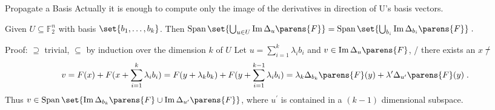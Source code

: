 \documentclass[%
    10pt,
    professionalfont,
    aspectratio=169,
]{beamer}
\newcommand{\F}{\mathbb{F}}
\newcommand{\derive}[2]{\Delta_{#1}\parens{#2}}
\DeclareMathOperator{\ImOp}{Im}
\renewcommand{\Im}[1]{\ImOp {#1}}
\DeclareMathOperator{\SpanOp}{Span}
\newcommand{\Span}[1]{\SpanOp\set{#1}}
\begin{document}
\begin{frame}{Propagate a Basis}
    Actually it is enough to compute only the image of the derivatives in direction of U's basis vectors.
    \begin{lemma}
        Given $U \subseteq \F_2^n$ with basis $\set{b_1, \ldots, b_k}$.
        Then
        $
            \Span{\bigcup_{u \in U} \Im{\derive{u}{F}}} = \Span{\bigcup_{b_i} \Im{\derive{b_i}{F}}}\;.
        $
    \end{lemma}
    \pause
    \begin{block}{Proof: $\supseteq$ trivial, $\subseteq$ by induction over the dimension $k$ of $U$}
        Let $u = \sum_{i=1}^k \lambda_i b_i$ and $v \in \Im{\derive{u}{F}}$, \ie/ there exists an $x$ \st/
        \begin{equation*}
            v = F(x) + F(x + \sum_{i=1}^k \lambda_i b_i)
              = F(y + \lambda_k b_k) + F(y + \sum_{i=1}^{k-1} \lambda_i b_i)
              = \lambda_k \derive{b_k}{F}(y) + \lambda^\prime \derive{u^\prime}{F}(y)\;.
        \end{equation*}
        Thus $v \in \Span{\Im{\derive{b_k}{F}} \cup \Im{\derive{u^\prime}{F}}}$, where $u^\prime$ is contained in a $(k-1)$ dimensional subspace.
    \end{block}
\end{frame}
\end{document}
